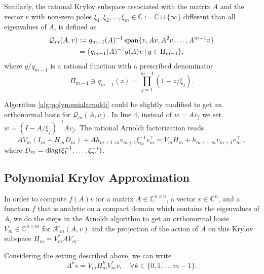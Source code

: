 Similarly, the rational Krylov subspace \cite{guttel2013rational} associated with
the matrix $A$ and the vector $v$ with non-zero poles
$\xi_1, \xi_2, \dots, \xi_m \in \overline{\mathbb{C}} := \mathbb{C} \cup \{ \infty\}$ different than all eigenvalues of $A$, is defined as
\begin{equation}
    \label{eq:rationalkrylovsubspacedefinition}
    \begin{aligned}
        \mathcal{Q}_m(A, v) & := q_{m-1}(A)^{-1} \operatorname{span}\{v, Av, A^{2}v, \dots, A^{m-1}v \}\\
         & = \{q_{m-1}(A)^{-1} g(A)v \:|\: g \in \Pi_{m-1} \},
    \end{aligned}
\end{equation}
where $g / q_{m-1}$ is a rational function with a prescribed denominator
\begin{equation*}
    \Pi_{m-1} \ni q_{m-1}(z) = \prod_{j=1}^{m-1}(1 - z / \xi_j).
\end{equation*}

Algorithm \ref{alg:polynomialarnoldi} could be slightly modified to get an orthonormal
basis for $\mathcal{Q}_m(A, v)$. In line 4, instead of $w = A v_j$ we set
$w = (I - A / \xi_j)^{-1} A v_j$. The rational Arnoldi factorization reads
\begin{equation}
    \label{eq:rationalarnoldifactorization}
    A V_m (I_m + H_m D_m) + A h_{m+1, m} v_{m+1} \xi_m^{-1} e_m^\top = V_m H_m + h_{m+1, m} v_{m+1} e_m^\top.,
\end{equation}
where $D_m = \operatorname{diag}(\xi_1^{-1}, \dots, \xi_m^{-1})$.

\subsection{Polynomial Krylov Approximation}
\label{sec:polynomialkrylovapproximation}
In order to compute $f(A)v$ for a matrix $A \in \mathbb{C}^{n \times n}$, a vector
$v \in \mathbb{C}^n$, and a function $f$ that is analytic on a compact domain which
contains the eigenvalues of $A$, we do the steps in the Arnoldi algorithm to get
an orthonormal basis $V_m \in \mathbb{C}^{n \times m}$ for $\mathcal{K}_m(A, v)$ and
the projection of the action of $A$ on this Krylov subspace $H_m = V_m^* A V_m$.

\begin{lemma}
    \label{lem:krylovsubspacepowered}
    Considering the setting described above, we can write
    \begin{equation}
        A^k v = V_m H_m^k V_m^* v, \quad \forall k \in \{0, 1, \dots, m-1 \}.
    \end{equation}
\end{lemma}

